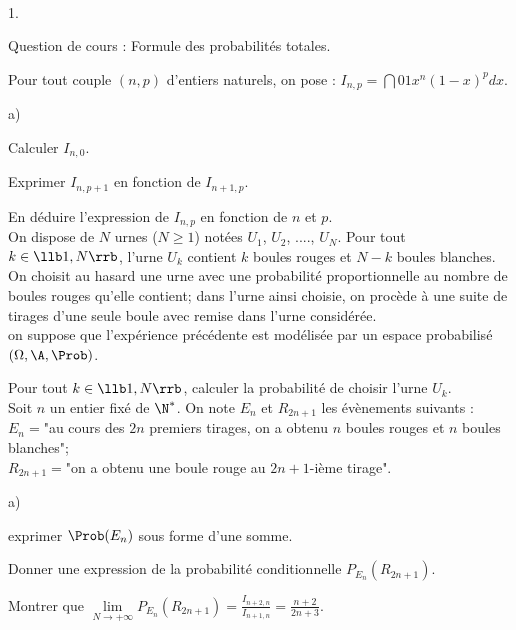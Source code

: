\documentclass[11pt]{article}%
\begin{document}
\begin{exerciceAP}~
  \begin{noliste}{1.}
    \setlength{\itemsep}{2mm}
  \item Question de cours : Formule des probabilités totales.
  \item Pour tout couple $(n,p)$ d'entiers naturels, on pose :
    $I_{n,p}= \dint{0}{1} x^n(1-x)^p dx$.
    \begin{noliste}{a)}
    \setlength{\itemsep}{2mm}
    \item Calculer $I_{n,0}$.
    \item Exprimer $I_{n, p+1}$ en fonction de $I_{n+1,p}$.
    \item En déduire l'expression de $I_{n,p}$ en fonction de $n$ et
      $p$.\\
      On dispose de $N$ urnes ($N \geq 1$) notées $U_1$, $U_2$, ....,
      $U_N$. Pour tout $k \in \llb 1, N \rrb$, l'urne $U_k$ contient
      $k$ boules rouges et $N-k$ boules blanches.\\
      On choisit au hasard une urne avec une probabilité
      proportionnelle au nombre de boules rouges qu'elle contient;
      dans l'urne ainsi choisie, on procède à une suite de tirages
      d'une seule boule avec remise dans l'urne considérée.\\ 
      on suppose que l'expérience précédente est modélisée par un
      espace probabilisé $(\Omega, \A, \Prob)$.
    \end{noliste}
  \item Pour tout $k \in \llb 1 ,N \rrb$, calculer la probabilité de
    choisir l'urne $U_k$.\\  
    Soit $n$ un entier fixé de $\N^*$. On note $E_n$ et $R_{2n+1}$ les
    évènements suivants : \\ 
    $E_n=$"au cours des $2n$ premiers tirages, on a obtenu $n$ boules
    rouges et $n$ boules blanches"; \\ 
    $R_{2n+1}=$"on a obtenu une boule rouge au $2n+1$-ième tirage".\\
  \item \begin{noliste}{a)}
    \setlength{\itemsep}{2mm}
    \item exprimer $\Prob(E_n)$ sous forme d'une somme.
    \item Donner une expression de la probabilité conditionnelle
      $P_{E_n}(R_{2n+1})$.
    \end{noliste}
  \item Montrer que $\lim \limits_{ N \to + \infty} P_{E_n}(R_{2n+1})=
    \frac{I_{n+2,n}}{I_{n+1,n}}= \frac{n+2}{2n+3}$.
  \end{noliste}

\end{exerciceAP}
\end{document}
